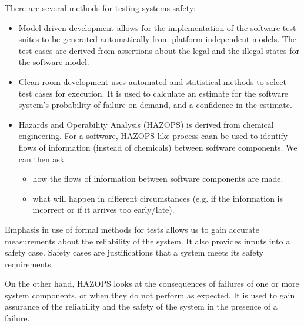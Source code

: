 \documentclass[a4paper, openany]{memoir}
\begin{document}
There are several methods for testing systems safety:
\begin{itemize}
    \item Model driven development allows for the implementation of the software test suites to be generated automatically from platform-independent models. The test cases are derived from assertions about the legal and the illegal states for the software model.
    \item Clean room development uses automated and statistical methods to select test cases for execution. It is used to calculate an estimate for the software system's probability of failure on demand, and a confidence in the estimate.
    \item Hazards and Operability Analysis (HAZOPS) is derived from chemical engineering. For a software, HAZOPS-like process caan be used to identify flows of information (instead of chemicals) between software components. We can then ask
    \begin{itemize}
        \item how the flows of information between software components are made.
        \item what will happen in different circumstances (e.g. if the information is incorrect or if it arrives too early/late).
    \end{itemize}
\end{itemize}

Emphasis in use of formal methods for tests allows us to gain accurate measurements about the reliability of the system. It also provides inputs into a safety case. Safety cases are justifications that a system meets its safety requirements. 

On the other hand, HAZOPS looks at the consequences of failures of one or more system components, or when they do not perform as expected. It is used to gain assurance of the reliability and the safety of the system in the presence of a failure.
\end{document}
